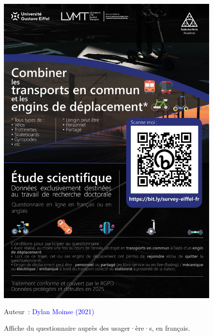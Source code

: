 \begin{refsegment}
    \begin{figure}[h!]\vspace*{4pt}
        \caption{Affiche du questionnaire auprès des usager·ère·s, en français.}
        \label{fig-chap3:affiche-questionnaire}
        \centerline{\includegraphics[width=1\columnwidth]{src/Figures/Chap-3/FR_Affiche_Questionnaire.jpg}}
        \vspace{5pt}
        \begin{flushright}\scriptsize{
        Auteur~: \textcolor{blue}{Dylan Moinse (2021)}
        }\end{flushright}
    \end{figure}


\end{refsegment}
